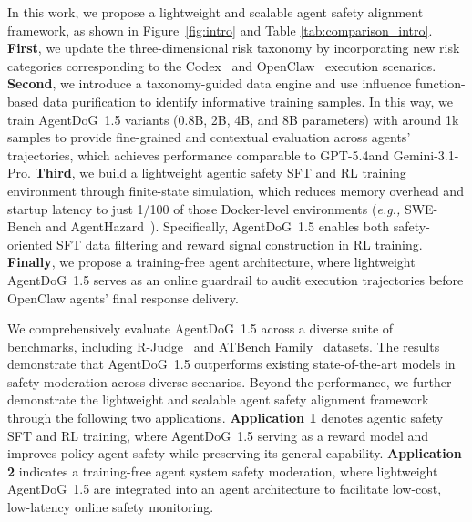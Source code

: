 \documentclass{llmxive}
\providecommand{\toolAG}{{\agentdog{}}\xspace}
\providecommand{\agentdog}{AgentDoG~1.5\xspace}
\begin{document}
In this work, we propose a lightweight and scalable agent safety alignment framework, as shown in Figure~\ref{fig:intro} and Table \ref{tab:comparison_intro}. \textbf{First}, we update the three-dimensional risk taxonomy \citep{liu2026agentdogdiagnosticguardrailframework, li2026atbench} by incorporating new risk categories corresponding to the Codex~\citep{openai_codex_2025} and OpenClaw~\citep{steinberger2026openclaw} execution scenarios. \textbf{Second}, we introduce a taxonomy-guided data engine and use influence function-based data purification to identify informative training samples. In this way, we train \agentdog{} variants (0.8B, 2B, 4B, and 8B parameters) with around 1k samples to provide fine-grained and contextual evaluation across agents’ trajectories, which achieves performance comparable to GPT-5.4and Gemini-3.1-Pro. \textbf{Third}, we build a lightweight agentic safety SFT and RL training environment through finite-state simulation, which reduces memory overhead and startup latency to just 1/100 of those Docker-level environments (\emph{e.g.,} SWE-Bench \citep{jimenez2024swe} and AgentHazard~\citep{feng2026agenthazard}). Specifically, \toolAG{} enables both safety-oriented SFT data filtering and reward signal construction in RL training. \textbf{Finally}, we propose a training-free agent architecture, where lightweight \agentdog{} serves as an online guardrail to audit execution trajectories before OpenClaw agents' final response delivery.


We comprehensively evaluate \agentdog{} across a diverse suite of benchmarks, including R-Judge~\citep{rjudge2024} and ATBench Family~\citep{li2026atbench} datasets. The results demonstrate that \agentdog{} outperforms existing state-of-the-art models in safety moderation across diverse scenarios. Beyond the performance, we further demonstrate the lightweight and scalable agent safety alignment framework through the following two applications. \textbf{Application 1} denotes agentic safety SFT and RL training, where  \agentdog{} serving as a reward model and improves policy agent safety while preserving its general capability. \textbf{Application 2} indicates a training-free agent system safety moderation, where lightweight \agentdog{} are integrated into an agent architecture to facilitate low-cost, low-latency online safety monitoring.
\end{document}
